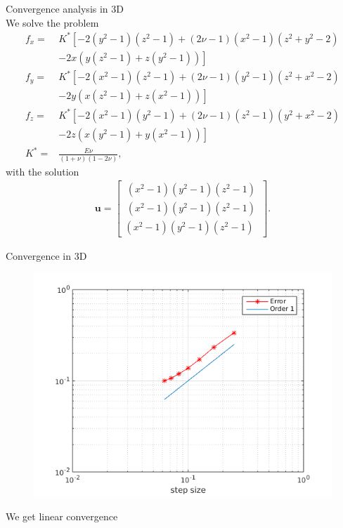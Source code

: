 \documentclass[screen]{beamer}
\begin{document}
\begin{frame}
Convergence analysis in 3D \\

\tiny
We solve the problem
\begin{align*}
f_x = &K^* \left[-2(y^2-1)(z^2-1) + (2 \nu -1)(x^2-1)(z^2 +y^2-2) \right.\nonumber\\
 &\left. -2x(y(z^2-1) + z(y^2-1)) \right] \\
 f_y = &K^* \left[-2(x^2-1)(z^2-1) + (2 \nu -1)(y^2-1)(z^2 +x^2-2) \right.\nonumber\\
 &\left. -2y(x(z^2-1) + z(x^2-1)) \right] \\
 f_z = &K^* \left[-2(x^2-1)(y^2-1) + (2 \nu -1)(z^2-1)(y^2 +x^2-2) \right.\nonumber\\
 &\left. -2z(x(y^2-1) + y(x^2-1)) \right] \\
 K^* = & \frac{E \nu}{(1+\nu)(1-2\nu)},
\end{align*}
with the solution
\begin{align*}
\bm{u} = \begin{bmatrix}
\, (x^2-1)(y^2-1)(z^2-1) \, \\
\, (x^2-1)(y^2-1)(z^2-1) \, \\
(x^2-1)(y^2-1)(z^2-1)
\end{bmatrix}.
\end{align*}


\end{frame}

\begin{frame}
Convergence in 3D

\begin{figure}
  		\includegraphics[scale=0.45]{figures/convergence3d}
\end{figure}
We get linear convergence
\end{frame}
\end{document}
